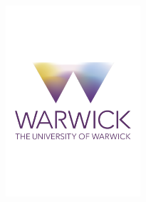 \begin{titlepage}
\begin{center}
\begin{spacing}{2}
\begin{center}
\vspace*{24pt}
\includegraphics[width=5cm]{warwick_logo} 

\end{center}
\end{spacing}
\end{center}
\end{titlepage}
